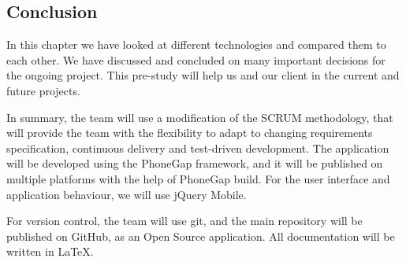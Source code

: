 \subsection{Conclusion}
In this chapter we have looked at different technologies and compared them to each other.  We have discussed and concluded on many important decisions for the ongoing project. This pre-study will help us and our client in the current and future projects.

In summary, the team will use a modification of the SCRUM methodology, that will provide the team with the flexibility to adapt to changing requirements specification, continuous delivery and test-driven development. The application will be developed using the PhoneGap framework, and it will be published on multiple platforms with the help of PhoneGap build. For the user interface and application behaviour, we will use jQuery Mobile. 

For version control, the team will use git, and the main repository will be published on GitHub, as an Open Source application. All documentation will be written in LaTeX.

